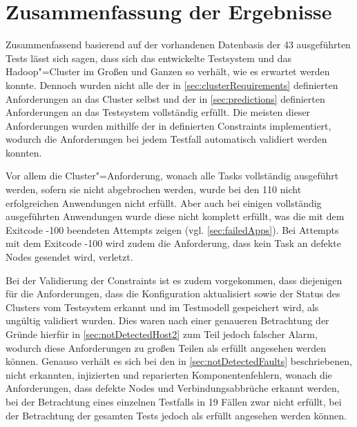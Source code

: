 \section{Zusammenfassung der Ergebnisse}
\label{sec:evaluationResults}

Zusammenfassend basierend auf der vorhandenen Datenbasis der 43 ausgeführten Tests lässt sich sagen, dass sich das entwickelte Testsystem und das Hadoop"=Cluster im Großen und Ganzen so verhält, wie es erwartet werden konnte.
Dennoch wurden nicht alle der in \autoref{sec:clusterRequirements} definierten Anforderungen an das Cluster selbst und der in \autoref{sec:predictions} definierten Anforderungen an das Testsystem vollständig erfüllt.
Die meisten dieser Anforderungen wurden mithilfe der in  definierten Constraints implementiert, wodurch die Anforderungen bei jedem Testfall automatisch validiert werden konnten.

Vor allem die Cluster"=Anforderung, wonach alle Tasks vollständig ausgeführt werden, sofern sie nicht abgebrochen werden, wurde bei den 110 nicht erfolgreichen Anwendungen nicht erfüllt.
Aber auch bei einigen vollständig ausgeführten Anwendungen wurde diese nicht komplett erfüllt, was die mit dem Exitcode -100 beendeten Attempts zeigen (vgl. \autoref{sec:failedApps}).
Bei Attempts mit dem Exitcode -100 wird zudem die Anforderung, dass kein Task an defekte Nodes gesendet wird, verletzt.

Bei der Validierung der Constraints ist es zudem vorgekommen, dass diejenigen für die Anforderungen, dass die Konfiguration aktualisiert sowie der Status des Clusters vom Testsystem erkannt und im Testmodell gespeichert wird, als ungültig validiert wurden.
Dies waren nach einer genaueren Betrachtung der Gründe hierfür in \autoref{sec:notDetectedHost2} zum Teil jedoch falscher Alarm, wodurch diese Anforderungen zu großen Teilen als erfüllt angesehen werden können.
Genauso verhält es sich bei den in \autoref{sec:notDetectedFaults} beschriebenen, nicht erkannten, injizierten und reparierten Komponentenfehlern, wonach die Anforderungen, dass defekte Nodes und Verbindungsabbrüche erkannt werden, bei der Betrachtung eines einzelnen Testfalls in 19 Fällen zwar nicht erfüllt, bei der Betrachtung der gesamten Tests jedoch als erfüllt angesehen werden können.

